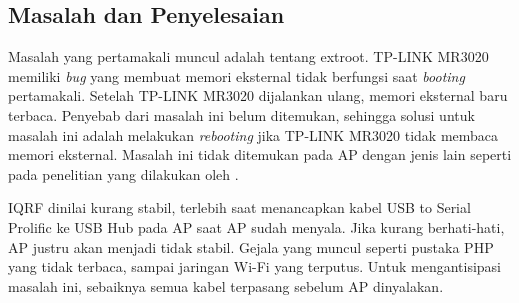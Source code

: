 		\subsection{Masalah dan Penyelesaian}
			Masalah yang pertamakali muncul adalah tentang extroot. TP-LINK MR3020 memiliki \emph{bug} yang membuat memori eksternal tidak berfungsi saat \emph{booting} pertamakali. Setelah TP-LINK MR3020 dijalankan ulang, memori eksternal baru terbaca. Penyebab dari masalah ini belum ditemukan, sehingga solusi untuk masalah ini adalah melakukan \emph{rebooting} jika TP-LINK MR3020 tidak membaca memori eksternal. Masalah ini tidak ditemukan pada AP dengan jenis lain seperti pada penelitian yang dilakukan oleh \cite{wibowo2013wireless}.

			
			IQRF dinilai kurang stabil, terlebih saat menancapkan kabel USB to Serial Prolific ke USB Hub pada AP saat AP sudah menyala. Jika kurang berhati-hati, AP justru akan menjadi tidak stabil. Gejala yang muncul seperti pustaka PHP yang tidak terbaca, sampai jaringan Wi-Fi yang terputus. Untuk mengantisipasi masalah ini, sebaiknya semua kabel terpasang sebelum AP dinyalakan.
			

